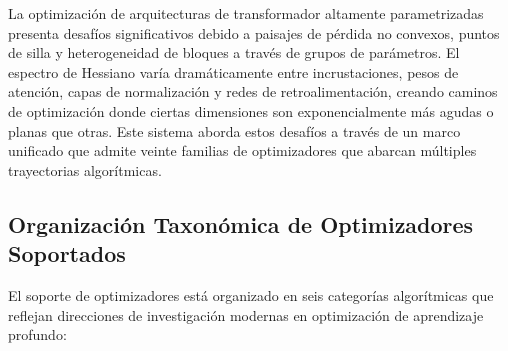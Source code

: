 \documentclass[11pt,a4paper]{article}
\begin{document}
La optimización de arquitecturas de transformador altamente parametrizadas presenta desafíos significativos debido a paisajes de pérdida no convexos, puntos de silla y heterogeneidad de bloques a través de grupos de parámetros. El espectro de Hessiano varía dramáticamente entre incrustaciones, pesos de atención, capas de normalización y redes de retroalimentación, creando caminos de optimización donde ciertas dimensiones son exponencialmente más agudas o planas que otras. Este sistema aborda estos desafíos a través de un marco unificado que admite veinte familias de optimizadores que abarcan múltiples trayectorias algorítmicas.

\subsection{Organización Taxonómica de Optimizadores Soportados}

El soporte de optimizadores está organizado en seis categorías algorítmicas que reflejan direcciones de investigación modernas en optimización de aprendizaje profundo:
\end{document}
